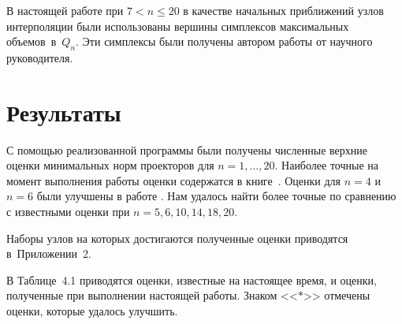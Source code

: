 \documentclass[12pt, a4paper]{extarticle}
\begin{document}
В настоящей работе при $7<n\leq 20$ в качестве начальных приближений узлов интерполяции были использованы вершины симплексов максимальных объемов~в~$Q_n$. Эти симплексы были 
получены автором работы от научного руководителя.


\newpage
\section{Результаты} 

С помощью реализованной программы были получены численные верхние оценки минимальных норм проекторов для $n=1,\ldots,20$. Наиболее точные на момент выполнения работы оценки 
содержатся в книге~\cite{1}. Оценки для $n = 4$ и $n = 6$ были улучшены в работе \cite{10}.
Нам удалось найти более точные по сравнению с известными оценки при  $n = 5, 6, 10, 14, 18, 20$.

Наборы узлов на которых достигаются полученные оценки приводятся в~Приложении~2.
 
В Таблице~4.1 приводятся оценки, известные на настоящее время, и оценки, полученные при выполнении настоящей работы. Знаком  <<$*$>> отмечены оценки, которые удалось улучшить.
\end{document}
